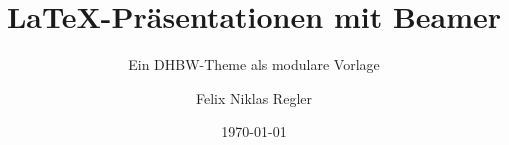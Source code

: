 \title{LaTeX-Präsentationen mit Beamer}
\subtitle{Ein DHBW-Theme als modulare Vorlage}
\author{Felix Niklas Regler}
\date{\today}

\newcommand{\Veranstaltung}{Seminar Wissenschaftliches Arbeiten}
\newcommand{\Kurs}{WDSKI23B}
\newcommand{\Anlass}{Projektpräsentation}

\renewcommand{\insertshortauthor}{F. Regler}
\renewcommand{\insertshorttitle}{LaTeX Beamer @ DHBW}